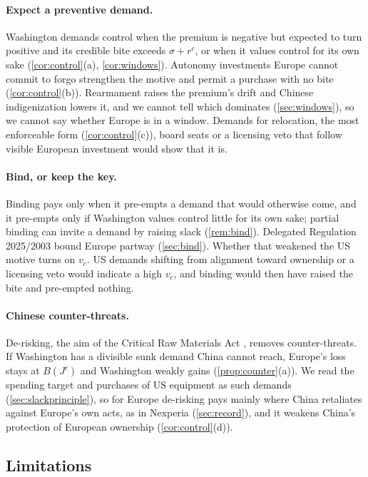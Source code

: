 \paragraph{Expect a preventive demand.} Washington demands control when the premium is negative but expected to turn positive and its credible bite exceeds $\sigma+r^c$, or when it values control for its own sake (\cref{cor:control}(a), \cref{cor:windows}). Autonomy investments Europe cannot commit to forgo strengthen the motive and permit a purchase with no bite (\cref{cor:control}(b)). Rearmament raises the premium's drift and Chinese indigenization lowers it, and we cannot tell which dominates (\cref{sec:windows}), so we cannot say whether Europe is in a window. Demands for relocation, the most enforceable form (\cref{cor:control}(c)), board seats or a licensing veto that follow visible European investment would show that it is.

\paragraph{Bind, or keep the key.} Binding pays only when it pre-empts a demand that would otherwise come, and it pre-empts only if Washington values control little for its own sake; partial binding can invite a demand by raising slack (\cref{rem:bind}). Delegated Regulation 2025/2003 \citep{eu2025dualuse} bound Europe partway (\cref{sec:bind}). Whether that weakened the US motive turns on $v_c$. US demands shifting from alignment toward ownership or a licensing veto would indicate a high $v_c$, and binding would then have raised the bite and pre-empted nothing.

\paragraph{Chinese counter-threats.} De-risking, the aim of the Critical Raw Materials Act \citep{eu2024crma}, removes counter-threats. If Washington has a divisible sunk demand China cannot reach, Europe's loss stays at $B(J^c)$ and Washington weakly gains (\cref{prop:counter}(a)). We read the spending target and purchases of US equipment as such demands (\cref{sec:slackprinciple}), so for Europe de-risking pays mainly where China retaliates against Europe's own acts, as in Nexperia (\cref{sec:record}), and it weakens China's protection of European ownership (\cref{cor:control}(d)).

\subsection{Limitations}\label{sec:limits}

